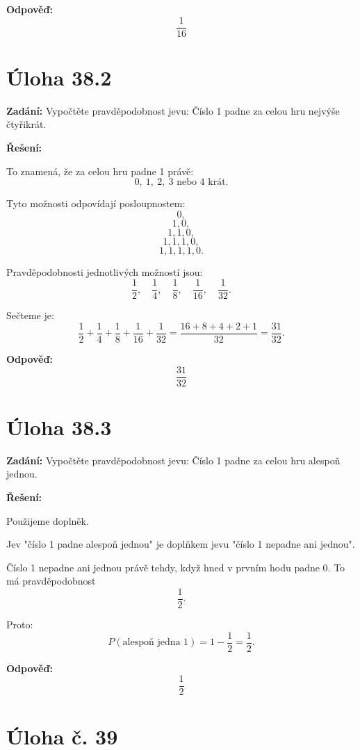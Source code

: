 \documentclass[12pt,a4paper]{article}
\begin{document}
\bigskip

\textbf{Odpověď:}  
\[
\frac{1}{16}
\]


\section*{Úloha 38.2}

\textbf{Zadání:}  
Vypočtěte pravděpodobnost jevu:  
Číslo 1 padne za celou hru nejvýše čtyřikrát.

\bigskip

\textbf{Řešení:}

To znamená, že za celou hru padne 1 právě:
\[
0,\ 1,\ 2,\ 3 \text{ nebo } 4 \text{ krát.}
\]

Tyto možnosti odpovídají posloupnostem:
\[
0,
\]
\[
1,0,
\]
\[
1,1,0,
\]
\[
1,1,1,0,
\]
\[
1,1,1,1,0.
\]

Pravděpodobnosti jednotlivých možností jsou:
\[
\frac12,\quad \frac14,\quad \frac18,\quad \frac{1}{16},\quad \frac{1}{32}.
\]

Sečteme je:
\[
\frac12+\frac14+\frac18+\frac{1}{16}+\frac{1}{32}
= \frac{16+8+4+2+1}{32}
= \frac{31}{32}.
\]

\bigskip

\textbf{Odpověď:}  
\[
\frac{31}{32}
\]


\section*{Úloha 38.3}

\textbf{Zadání:}  
Vypočtěte pravděpodobnost jevu:  
Číslo 1 padne za celou hru alespoň jednou.

\bigskip

\textbf{Řešení:}

Použijeme doplněk.

Jev "číslo 1 padne alespoň jednou" je doplňkem jevu "číslo 1 nepadne ani jednou".

Číslo 1 nepadne ani jednou právě tehdy, když hned v prvním hodu padne 0. To má pravděpodobnost
\[
\frac12.
\]

Proto:
\[
P(\text{alespoň jedna 1}) = 1-\frac12 = \frac12.
\]

\bigskip

\textbf{Odpověď:}  
\[
\frac12
\]



\newpage
\section*{Úloha č. 39}
\end{document}
